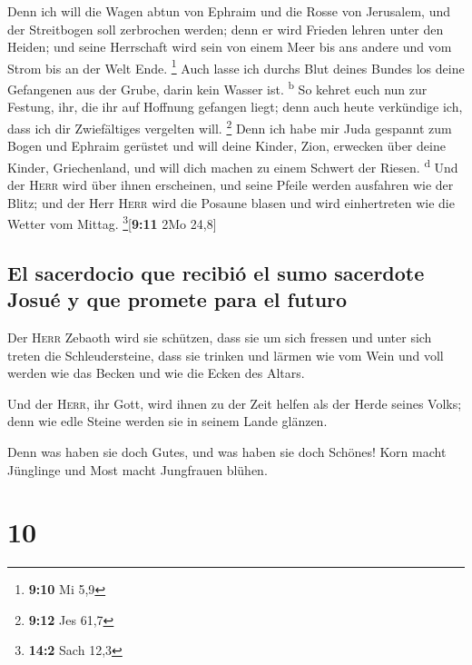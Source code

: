  Denn ich will die Wagen abtun von Ephraim und die Rosse
von Jerusalem, und der Streitbogen soll zerbrochen werden; denn er wird
Frieden lehren unter den Heiden; und seine Herrschaft wird sein von
einem Meer bis ans andere und vom Strom bis an der Welt Ende.
\footnote{\textbf{9:10} Mi 5,9}  Auch lasse ich durchs
Blut deines Bundes los deine Gefangenen aus der Grube, darin kein Wasser
ist. \textsuperscript{b}  So kehret euch nun zur Festung,
ihr, die ihr auf Hoffnung gefangen liegt; denn auch heute verkündige
ich, dass ich dir Zwiefältiges vergelten will. \footnote{\textbf{9:12}
  Jes 61,7}  Denn ich habe mir Juda gespannt zum Bogen
und Ephraim gerüstet und will deine Kinder, Zion, erwecken über deine
Kinder, Griechenland, und will dich machen zu einem Schwert der Riesen.
\textsuperscript{d}  Und der \textsc{Herr} wird über
ihnen erscheinen, und seine Pfeile werden ausfahren wie der Blitz; und
der Herr \textsc{Herr} wird die Posaune blasen und wird einhertreten wie
die Wetter vom Mittag. \footnote{\textbf{14:2} Sach 12,3}{[}\textbf{9:11}
2Mo 24,8{]}

\hypertarget{el-sacerdocio-que-recibiuxf3-el-sumo-sacerdote-josuuxe9-y-que-promete-para-el-futuro}{%
\subsection{El sacerdocio que recibió el sumo sacerdote Josué y que
promete para el
futuro}\label{el-sacerdocio-que-recibiuxf3-el-sumo-sacerdote-josuuxe9-y-que-promete-para-el-futuro}}

 Der \textsc{Herr} Zebaoth wird sie schützen, dass sie um
sich fressen und unter sich treten die Schleudersteine, dass sie trinken
und lärmen wie vom Wein und voll werden wie das Becken und wie die Ecken
des Altars.

 Und der \textsc{Herr}, ihr Gott, wird ihnen zu der Zeit
helfen als der Herde seines Volks; denn wie edle Steine werden sie in
seinem Lande glänzen.

 Denn was haben sie doch Gutes, und was haben sie doch
Schönes! Korn macht Jünglinge und Most macht Jungfrauen blühen.

\hypertarget{section-9}{%
\section{10}\label{section-9}}


